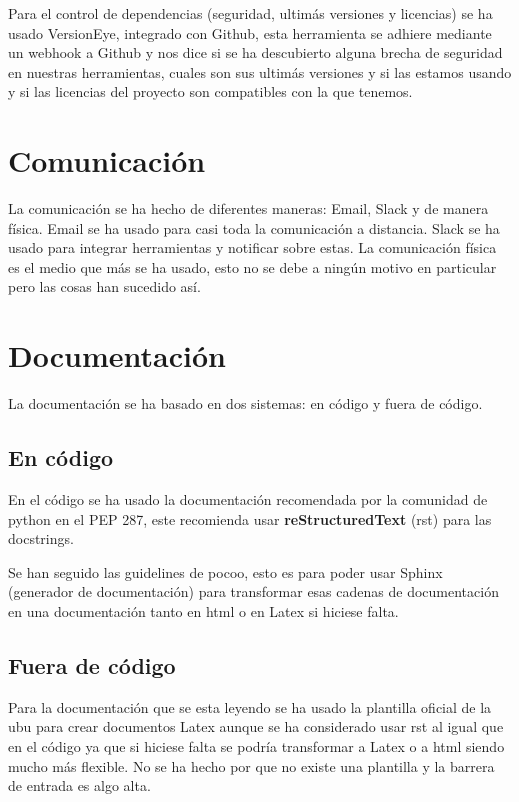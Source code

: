 Para el control de dependencias (seguridad, ultimás versiones y licencias) se ha usado VersionEye, integrado con Github, esta herramienta se adhiere mediante un webhook a Github y nos dice si se ha descubierto alguna brecha de seguridad en nuestras herramientas, cuales son sus ultimás versiones y si las estamos usando y si las licencias del proyecto son compatibles con la que tenemos.


\section{Comunicación}

La comunicación se ha hecho de diferentes maneras: Email, Slack y de manera física. Email se ha usado para casi toda la comunicación a distancia. Slack se ha usado para integrar herramientas y notificar sobre estas. La comunicación física es el medio que más se ha usado, esto no se debe a ningún motivo en particular pero las cosas han sucedido así.


\section{Documentación}

La documentación se ha basado en dos sistemas: en código y fuera de código. 

\subsection{En código}

En el código se ha usado la documentación recomendada por la comunidad de python en el PEP 287, este recomienda usar \textbf{reStructuredText} (rst) para las docstrings.

Se han seguido las guidelines de pocoo, esto es para poder usar Sphinx (generador de documentación) para transformar esas cadenas de documentación en una documentación tanto en html o en Latex si hiciese falta.

\subsection{Fuera de código}

Para la documentación que se esta leyendo se ha usado la plantilla oficial de la ubu para crear documentos Latex aunque se ha considerado usar rst al igual que en el código ya que si hiciese falta se podría transformar a Latex o a html siendo mucho más flexible. No se ha hecho por que no existe una plantilla y la barrera de entrada es algo alta.


